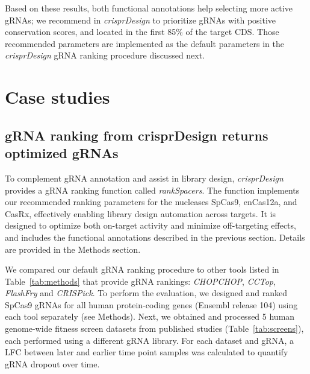\documentclass[pdftex,english,10pt]{article}
\begin{document}
Based on these results, both functional annotations help selecting more active gRNAs; we recommend in \textit{crisprDesign} to prioritize gRNAs with positive conservation scores, and located in the first 85\% of the target CDS. Those recommended parameters are implemented as the default parameters in the \textit{crisprDesign} gRNA ranking procedure discussed next. 






\section*{Case studies}





\subsection*{gRNA ranking from crisprDesign returns optimized gRNAs}

To complement gRNA annotation and assist in library design, \textit{crisprDesign} provides a gRNA ranking function called \textit{rankSpacers}. 
The function implements our recommended ranking parameters for the nucleases SpCas9, enCas12a, and CasRx, effectively enabling library design automation across targets. 
It is designed to optimize both on-target activity and minimize off-targeting effects, and includes the functional annotations described in the previous section. 
Details are provided in the Methods section. 


We compared our default gRNA ranking procedure to other tools listed in Table~\ref{tab:methods} that provide gRNA rankings: \textit{CHOPCHOP}, \textit{CCTop}, \textit{FlashFry} and \textit{CRISPick}. To perform the evaluation, we designed and ranked SpCas9 gRNAs for all human protein-coding genes (Ensembl release 104) using each tool separately (see Methods). Next, we obtained and processed 5 human genome-wide fitness screen datasets from published studies (Table~\ref{tab:screens}), each performed using a different gRNA library. For each dataset and gRNA, a LFC between later and earlier time point samples was calculated to quantify gRNA dropout over time. 
\end{document}
